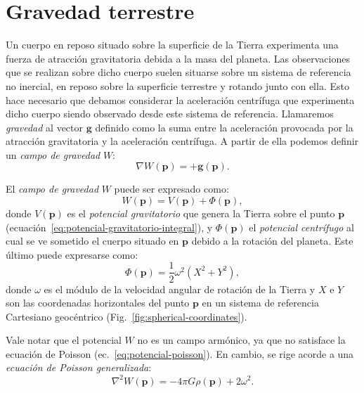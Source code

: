 
\section{Gravedad terrestre}
\label{sec:gravedad-terrestre}

Un cuerpo en reposo situado sobre la superficie de la Tierra experimenta una
fuerza de atracción gravitatoria debida a la masa del planeta.
Las observaciones que se realizan sobre dicho cuerpo suelen situarse sobre un
sistema de referencia no inercial, en reposo sobre la superficie terrestre
y rotando junto con ella.
Esto hace necesario que debamos considerar la aceleración centrífuga que
experimenta dicho cuerpo siendo observado desde este sistema de referencia.
Llamaremos \emph{gravedad} al vector $\mathbf{g}$ definido como la suma
entre la aceleración provocada por la atracción gravitatoria y la aceleración
centrífuga.
A partir de ella podemos definir un \emph{campo de gravedad} $W$:
%
\begin{equation}
    \nabla W(\mathbf{p}) = +\mathbf{g}(\mathbf{p}).
    \label{eq:campo-gravedad-terrestre}
\end{equation}

El \emph{campo de gravedad} $W$ puede ser expresado como:
%
\begin{equation}
    W(\mathbf{p}) = V(\mathbf{p}) + \Phi(\mathbf{p}),
\end{equation}
%
donde $V(\mathbf{p})$ es el \emph{potencial gravitatorio} que genera
la Tierra sobre el punto $\mathbf{p}$
(ecuación~\ref{eq:potencial-gravitatorio-integral}), y $\Phi(\mathbf{p})$ el
\emph{potencial centrífugo} al cual se ve sometido el cuerpo situado en
$\mathbf{p}$ debido a la rotación del planeta.
Este último puede expresarse como:
%
\begin{equation}
    \Phi(\mathbf{p}) = \frac{1}{2} \omega^2 (X^2 + Y^2),
    \label{eq:potencial-centrifugo}
\end{equation}
%
donde $\omega$ es el módulo de la velocidad angular de rotación de la
Tierra y $X$ e $Y$ son las coordenadas horizontales del punto $\mathbf{p}$ en
un sistema de referencia Cartesiano geocéntrico
(Fig.~\ref{fig:spherical-coordinates}).

Vale notar que el potencial $W$ no es un campo armónico, ya que no satisface
la ecuación de Poisson (ec.~\ref{eq:potencial-poisson}). En cambio, se rige
acorde a una \emph{ecuación de Poisson generalizada}:
%
\begin{equation}
    \nabla^2 W(\mathbf{p}) = - 4\pi G \rho(\mathbf{p}) + 2 \omega^2.
\end{equation}

